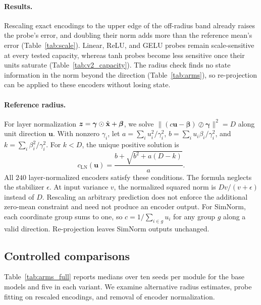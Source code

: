 
\paragraph{Results.} Rescaling exact encodings to the upper edge of the off-radius band already raises the probe's error, and doubling their norm adds more than the reference mean's error (Table~\ref{tab:scale}). Linear, ReLU, and GELU probes remain scale-sensitive at every tested capacity, whereas tanh probes become less sensitive once their units saturate (Table~\ref{tab:v2_capacity}). The radius check finds no state information in the norm beyond the direction (Table~\ref{tab:arms}), so re-projection can be applied to these encoders without losing state.

\paragraph{Reference radius.}
\label{app:radius}
For layer normalization $\bm{z}=\boldsymbol\gamma\odot\hat{\mathbf x}+\boldsymbol\beta$, we solve $\|(c\mathbf u-\boldsymbol\beta)\oslash\boldsymbol\gamma\|^2=D$ along unit direction $\mathbf u$. With nonzero $\gamma_i$, let $a=\sum_i u_i^2/\gamma_i^2$, $b=\sum_i u_i\beta_i/\gamma_i^2$, and $k=\sum_i\beta_i^2/\gamma_i^2$. For $k<D$, the unique positive solution is
\begin{equation}
c_{\mathrm{LN}}(\mathbf u)=\frac{b+\sqrt{b^2+a(D-k)}}{a}.
\end{equation}
All $240$ layer-normalized encoders satisfy these conditions. The formula neglects the stabilizer $\epsilon$. At input variance $v$, the normalized squared norm is $Dv/(v+\epsilon)$ instead of $D$. Rescaling an arbitrary prediction does not enforce the additional zero-mean constraint and need not produce an encoder output. For SimNorm, each coordinate group sums to one, so $c=1/\sum_{i\in g}u_i$ for any group $g$ along a valid direction. Re-projection leaves SimNorm outputs unchanged.



\subsection{Controlled comparisons}
\label{app:full_results}
\label{app:trained_more}
Table~\ref{tab:arms_full} reports medians over ten seeds per module for the base models and five in each variant. We examine alternative radius estimates, probe fitting on rescaled encodings, and removal of encoder normalization.

